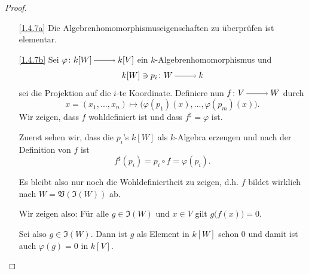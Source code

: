 \documentclass[a4paper,12pt,index=toc]{scrbook}
\theoremstyle{keinenummern} %
\def\V{\mathfrak{V}}
\def\I{\mathfrak{I}}
\renewcommand{\phi}{\varphi}
\renewcommand{\dotsc}{\ensuremath{\!...}}
\begin{document}
\begin{proof}
\begin{enumerate}
\item[\ref{1.4.7a}] Die Algebrenhomomorphismuseigenschaften zu überprüfen ist elementar.
\item[\ref{1.4.7b}] Sei $\phi\colon  k[W]\ra k[V]$ ein $k$-Algebrenhomomorphismus und \[k[W]\ni p_i\colon  W\ra k\] sei die Projektion auf die $i$-te Koordinate.
Definiere nun $f\colon V\ra W$ durch \[x=(x_1,\dotsc,x_n)\mapsto \bigl(\phi(p_1)(x),\dotsc,\phi(p_m)(x)\bigr).\]
Wir zeigen, dass $f$ wohldefiniert ist und dass $f^{\sharp}=\phi$ ist.

Zuerst sehen wir, dass die $p_i$'s $k[W]$ als $k$-Algebra erzeugen  und nach der Definition von $f$ ist 
\[f^{\sharp}(p_i)=p_i\circ f=\phi(p_i).\]

Es bleibt also nur noch die Wohldefiniertheit zu zeigen, d.h. $f$ bildet wirklich nach $W=\V(\I(W))$ ab.

Wir zeigen also: Für alle $g \in \I(W)$ und $x\in V$ gilt $g\bigl(f(x)\bigr)=0$. 

Sei also $g\in\I(W)$. Dann ist $g$ als Element in $k[W]$ schon $0$ und damit ist auch $\phi(g)=0$ in $k[V]$. 


\end{enumerate}
\end{proof}
\end{document}

